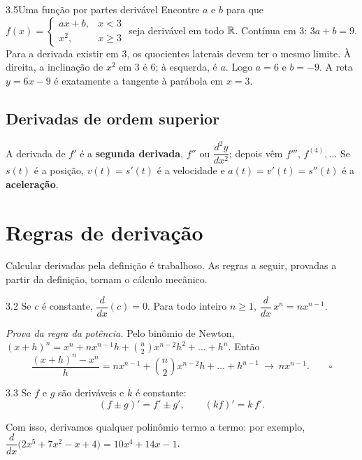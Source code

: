 \begin{exemplo}{3.5}{Uma função por partes derivável}
Encontre $a$ e $b$ para que $f(x)=\begin{cases}ax+b,&x<3\\x^2,&x\ge3\end{cases}$ seja
derivável em todo $\mathbb{R}$.
\solucao
Contínua em 3: $3a+b=9$. Para a derivada existir em 3, os quocientes laterais devem ter o
mesmo limite. À direita, a inclinação de $x^2$ em 3 é 6; à esquerda, é $a$. Logo $a=6$ e
$b=-9$. A reta $y=6x-9$ é exatamente a tangente à parábola em $x=3$.
\end{exemplo}

\subsection{Derivadas de ordem superior}

A derivada de $f'$ é a \textbf{segunda derivada}, $f''$ ou $\dfrac{d^2y}{dx^2}$; depois vêm
$f'''$, $f^{(4)},\dots$ Se $s(t)$ é a posição, $v(t)=s'(t)$ é a velocidade e
$a(t)=v'(t)=s''(t)$ é a \textbf{aceleração}.

\section{Regras de derivação}

Calcular derivadas pela definição é trabalhoso. As regras a seguir, provadas a partir da
definição, tornam o cálculo mecânico.

\begin{teorema}{3.2}
Se $c$ é constante, $\dfrac{d}{dx}(c)=0$. Para todo inteiro $n\ge1$,
$\dfrac{d}{dx}\,x^n=nx^{n-1}$.
\end{teorema}
\emph{Prova da regra da potência.} Pelo binômio de Newton,
$(x+h)^n=x^n+nx^{n-1}h+\binom n2x^{n-2}h^2+\dots+h^n$. Então
\[
\frac{(x+h)^n-x^n}{h}=nx^{n-1}+\binom n2x^{n-2}h+\dots+h^{n-1}\ \longrightarrow\ nx^{n-1}. \qquad\square
\]

\begin{teorema}{3.3}
Se $f$ e $g$ são deriváveis e $k$ é constante:
\[
(f\pm g)'=f'\pm g',\qquad (kf)'=k\,f'.
\]
\end{teorema}

Com isso, derivamos qualquer polinômio termo a termo: por exemplo,
$\dfrac{d}{dx}\big(2x^5+7x^2-x+4\big)=10x^4+14x-1$.

